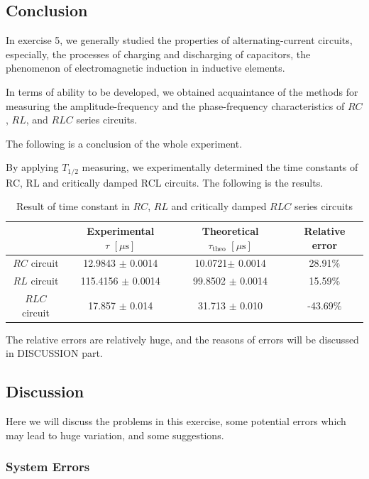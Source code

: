 \documentclass[a4paper]{article}
\begin{document}
\subsection{Conclusion}

In exercise 5, we generally studied the properties of alternating-current circuits, especially, the processes of charging and discharging of capacitors, the phenomenon of electromagnetic induction in inductive elements. 

In terms of ability to be developed, we obtained acquaintance of the methods for measuring the amplitude-frequency and the phase-frequency characteristics of $RC$, $RL$, and $RLC$ series circuits. 

The following is a conclusion of the whole experiment.

By applying $T_{1/2}$ measuring, we experimentally determined the time constants of RC, RL and critically damped RCL circuits. The following is the results.

\begin{table}[!htbp]
\centering
\begin{tabular}{c c c c}
\hline
& Experimental $\tau\,\,[\mu\text{s}]$ & Theoretical $\tau_{\text{theo}}\,\,[\mu\text{s}]$ & Relative error\\
\hline
$RC$ circuit & 12.9843 $\pm$ 0.0014 & 10.0721$\pm$ 0.0014 & 28.91$\%$\\
$RL$ circuit & 115.4156 $\pm$ 0.0014 & 99.8502 $\pm$ 0.0014 & 15.59$\%$\\
$RLC$ circuit & 17.857 $\pm$ 0.014 & 31.713 $\pm$ 0.010 & -43.69$\%$\\
\hline
\end{tabular}
\caption{Result of time constant in $RC$, $RL$ and critically damped $RLC$ series circuits}
\end{table}

The relative errors are relatively huge, and the reasons of errors will be discussed in DISCUSSION part.

\subsection{Discussion}

Here we will discuss the problems in this exercise, some potential errors which may lead to huge variation, and some suggestions.

\subsubsection{System Errors}
\end{document}
